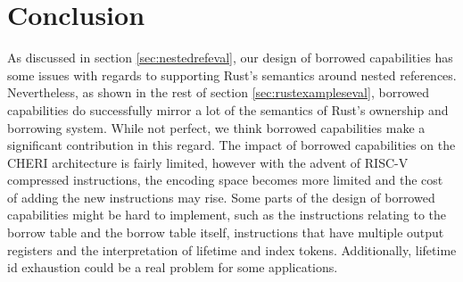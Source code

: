 \section{Conclusion}
As discussed in section \ref{sec:nestedrefeval}, our design of borrowed capabilities has some issues with regards to supporting Rust's semantics around nested references.
Nevertheless, as shown in the rest of section \ref{sec:rustexampleseval}, borrowed capabilities do successfully mirror a lot of the semantics of Rust's ownership and borrowing system.
While not perfect, we think borrowed capabilities make a significant contribution in this regard.
The impact of borrowed capabilities on the CHERI architecture is fairly limited, however with the advent of RISC-V compressed instructions, the encoding space becomes more limited and the cost of adding the new instructions may rise.
Some parts of the design of borrowed capabilities might be hard to implement, such as the instructions relating to the borrow table and the borrow table itself, instructions that have multiple output registers and the interpretation of lifetime and index tokens.
Additionally, lifetime id exhaustion could be a real problem for some applications.
